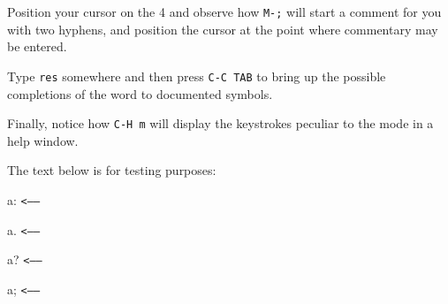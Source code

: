 Position your cursor on the 4 and observe how {\tt {}M-;} will start a comment 
for you with two hyphens, and position the cursor at the point where commentary
may be entered.

Type {\tt {}res} somewhere and then press {\tt {}C-C\ TAB} to bring up the
possible completions of the word to documented \Mtwo symbols.

Finally, notice how {\tt {}C-H\ m} will display the keystrokes peculiar to 
the mode in a help window.

The text below is for testing purposes:

    \def\f{\edef\g{\the\lastskip}{\tt<----- \g}\par}

    a: \f
    a. \f
    a? \f
    a; \f

